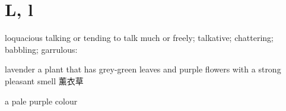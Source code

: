 \section{L, l}

\begin{DefWord}{loquacious}
    talking or tending to talk much or freely; talkative; chattering; babbling; garrulous:
\end{DefWord}

\begin{DefWord}{lavender}
    a plant that has grey-green leaves and purple flowers with a strong pleasant smell 薰衣草

    a pale purple colour
\end{DefWord}